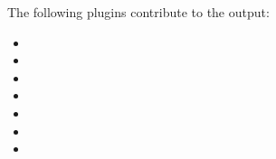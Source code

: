 \clearpage
The following plugins contribute to the output:
\begin{multicols}{2}
    \begin{itemize}
        \item {}
        \item {}
        \item {}
        \item {}
        \item {}
        \item {}
        \item {}
    \end{itemize}
\end{multicols}

